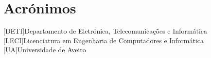
\chapter*{Acrónimos}
\begin{acronym}
    [DETI]{Departamento de Eletrónica, Telecomunicações e Informática}
    [LECI]{Licenciatura em Engenharia de Computadores e Informática}
    [UA]{Universidade de Aveiro}
\end{acronym}